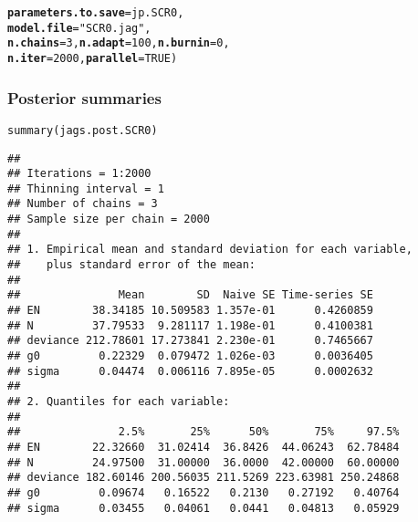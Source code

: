 \documentclass[color=usenames,dvipsnames]{beamer}\usepackage[]{graphicx}\usepackage[]{xcolor}
\makeatletter
\newcommand{\hlnum}[1]{\textcolor[rgb]{0.69,0.494,0}{#1}}%
\newcommand{\hlsng}[1]{\textcolor[rgb]{0.749,0.012,0.012}{#1}}%
\newcommand{\hldef}[1]{\textcolor[rgb]{0,0,0}{#1}}%
\newcommand{\hlkwc}[1]{\textcolor[rgb]{0,0,0}{\textbf{#1}}}%
\newcommand{\hlkwd}[1]{\textcolor[rgb]{0.004,0.004,0.506}{#1}}%
\newenvironment{kframe}{%
 \def\at@end@of@kframe{}%
 \ifinner\ifhmode%
  \def\at@end@of@kframe{\end{minipage}}%
  \begin{minipage}{\columnwidth}%
 \fi\fi%
 \def\FrameCommand##1{\hskip\@totalleftmargin \hskip-\fboxsep
 \colorbox{shadecolor}{##1}\hskip-\fboxsep
     \hskip-\linewidth \hskip-\@totalleftmargin \hskip\columnwidth}%
 \MakeFramed {\advance\hsize-\width
   \@totalleftmargin\z@ \linewidth\hsize
   \@setminipage}}%
 {\par\unskip\endMakeFramed%
 \at@end@of@kframe}
\newenvironment{knitrout}{}{} %
\let\hlstd\hldef
\let\hlstr\hlsng
\makeatother
\begin{document}
\begin{frame}[fragile]
\begin{knitrout}
\begin{kframe}
\begin{alltt}
                             \hlkwc{parameters.to.save}\hlstd{=jp.SCR0,}
                             \hlkwc{model.file}\hlstd{=}\hlstr{"SCR0.jag"}\hlstd{,}
                             \hlkwc{n.chains}\hlstd{=}\hlnum{3}\hlstd{,} \hlkwc{n.adapt}\hlstd{=}\hlnum{100}\hlstd{,} \hlkwc{n.burnin}\hlstd{=}\hlnum{0}\hlstd{,}
                             \hlkwc{n.iter}\hlstd{=}\hlnum{2000}\hlstd{,} \hlkwc{parallel}\hlstd{=}\hlnum{TRUE}\hlstd{)}
\end{alltt}
\end{kframe}
\end{knitrout}
\end{frame}




\begin{frame}[fragile]
  \frametitle{Posterior summaries}
\begin{knitrout}\tiny
{}\color{fgcolor}\begin{kframe}
\begin{alltt}
\hlkwd{summary}\hldef{(jags.post.SCR0)}
\end{alltt}
\begin{verbatim}
## 
## Iterations = 1:2000
## Thinning interval = 1 
## Number of chains = 3 
## Sample size per chain = 2000 
## 
## 1. Empirical mean and standard deviation for each variable,
##    plus standard error of the mean:
## 
##               Mean        SD  Naive SE Time-series SE
## EN        38.34185 10.509583 1.357e-01      0.4260859
## N         37.79533  9.281117 1.198e-01      0.4100381
## deviance 212.78601 17.273841 2.230e-01      0.7465667
## g0         0.22329  0.079472 1.026e-03      0.0036405
## sigma      0.04474  0.006116 7.895e-05      0.0002632
## 
## 2. Quantiles for each variable:
## 
##               2.5%       25%      50%       75%     97.5%
## EN        22.32660  31.02414  36.8426  44.06243  62.78484
## N         24.97500  31.00000  36.0000  42.00000  60.00000
## deviance 182.60146 200.56035 211.5269 223.63981 250.24868
## g0         0.09674   0.16522   0.2130   0.27192   0.40764
## sigma      0.03455   0.04061   0.0441   0.04813   0.05929
\end{verbatim}
\end{kframe}
\end{knitrout}
\end{frame}
\end{document}
